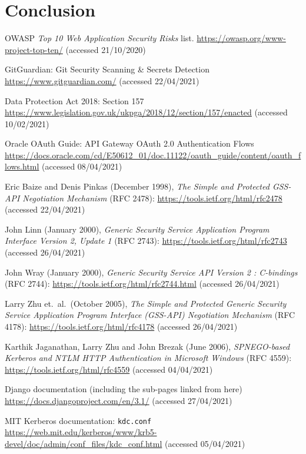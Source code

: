 \documentclass[12pt]{report}
\begin{document}
\chapter{Conclusion}

\begin{thebibliography}{99}
 OWASP \textit{Top 10 Web Application Security Risks} list. \url{https://owasp.org/www-project-top-ten/} (accessed 21/10/2020)

 GitGuardian: Git Security Scanning \& Secrets Detection \url{https://www.gitguardian.com/} (accessed 22/04/2021)

 Data Protection Act 2018: Section 157 \url{https://www.legislation.gov.uk/ukpga/2018/12/section/157/enacted} (accessed 10/02/2021)

 Oracle OAuth Guide: API Gateway OAuth 2.0 Authentication Flows \url{https://docs.oracle.com/cd/E50612_01/doc.11122/oauth_guide/content/oauth_flows.html} (accessed 08/04/2021)

 Eric Baize and Denis Pinkas (December 1998), \textit{The Simple and Protected GSS-API Negotiation Mechanism} (RFC 2478): \url{https://tools.ietf.org/html/rfc2478} (accessed 22/04/2021)

 John Linn (January 2000), \textit{Generic Security Service Application Program Interface Version 2, Update 1} (RFC 2743): \url{https://tools.ietf.org/html/rfc2743} (accessed 26/04/2021)

 John Wray (January 2000), \textit{Generic Security Service API Version 2 : C-bindings} (RFC 2744): \url{https://tools.ietf.org/html/rfc2744.html} (accessed 26/04/2021)

 Larry Zhu et.\ al.\ (October 2005), \textit{The Simple and Protected Generic Security Service Application Program Interface (GSS-API) Negotiation Mechanism} (RFC 4178): \url{https://tools.ietf.org/html/rfc4178} (accessed 26/04/2021)

 Karthik Jaganathan, Larry Zhu and John Brezak (June 2006), \textit{SPNEGO-based Kerberos and NTLM HTTP Authentication in Microsoft Windows} (RFC 4559): \url{https://tools.ietf.org/html/rfc4559} (accessed 04/04/2021)

 Django documentation (including the sub-pages linked from here) \url{https://docs.djangoproject.com/en/3.1/} (accessed 27/04/2021)

 MIT Kerberos documentation: \texttt{kdc.conf} \url{https://web.mit.edu/kerberos/www/krb5-devel/doc/admin/conf_files/kdc_conf.html} (accessed 05/04/2021)


\end{thebibliography}
\end{document}
